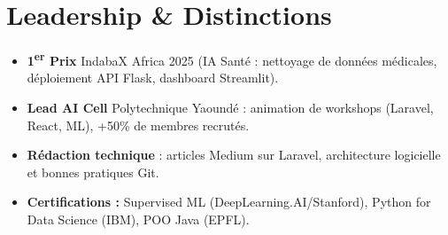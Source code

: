 \documentclass[a4paper,11pt]{article}
\begin{document}
\section{Leadership \& Distinctions}
\begin{itemize}[leftmargin=*, label=\tiny$\bullet$, nosep]
    \item \small{\textbf{1\textsuperscript{er} Prix} IndabaX Africa 2025 (IA Santé : nettoyage de données médicales, déploiement API Flask, dashboard Streamlit).}
    \item \small{\textbf{Lead AI Cell} Polytechnique Yaoundé : animation de workshops (Laravel, React, ML), +50\% de membres recrutés.}
    \item \small{\textbf{Rédaction technique} : articles Medium sur Laravel, architecture logicielle et bonnes pratiques Git.}
    \item \small{\textbf{Certifications :} Supervised ML (DeepLearning.AI/Stanford), Python for Data Science (IBM), POO Java (EPFL).}
\end{itemize}
\end{document}
